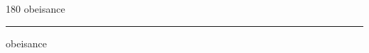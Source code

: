 
\begin{frame}
\begin{center}
\begin{turn}{180}
{\fontsize{2.5cm}{1em}\selectfont obeisance}
\end{turn}
\vspace{1em}\par  
\hrule
\vspace{1em}\par  
{\fontsize{2.5cm}{1em}\selectfont obeisance}
\end{center}
\end{frame}
